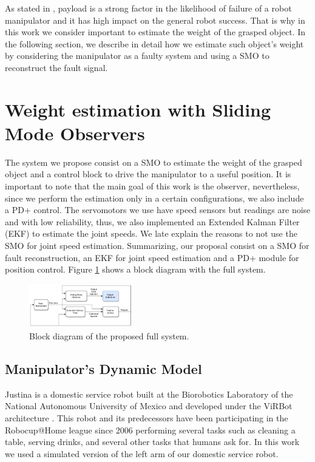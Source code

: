 \documentclass[conference,letterpaper]{ieeeconf}
\begin{document}
As stated in \cite{steinbauer2012survey}, payload is a strong factor in the likelihood of failure of a robot manipulator and it has high impact on the general robot success. That is why in this work we consider important to estimate the weight of the grasped object. In the following section, we describe in detail how we estimate such object's weight by considering the manipulator as a faulty system and using a SMO to reconstruct the fault signal.

\section{Weight estimation with Sliding Mode Observers}
\label{sec:System}

The system we propose consist on a SMO to estimate the weight of the grasped object and a control block to drive the manipulator to a useful position. It is important to note that the main goal of this work is the observer, nevertheless, since we perform the estimation only in a certain configurations, we also include a PD+ control. The servomotors we use have speed sensors but readings are noise and with low reliability, thus, we also implemented an Extended Kalman Filter (EKF) to estimate the joint speeds. We late explain the reasons to not use the SMO for joint speed estimation. Summarizing, our proposal consist on a SMO for fault reconstruction, an EKF for joint speed estimation and a PD+ module for position control. Figure \ref{fig:FullSystemBlocks} shows a block diagram with the full system. 
\begin{figure}
  \centering
  \includegraphics[width=0.4\textwidth]{Figures/full_system.pdf}
  \caption{Block diagram of the proposed full system.}
  \label{fig:FullSystemBlocks}
\end{figure}

\subsection{Manipulator's Dynamic Model}

Justina is a domestic service robot built at the Biorobotics Laboratory of the National Autonomous University of Mexico and developed under the ViRBot architecture \cite{savage2008virbot}. This robot and its predecessors have been participating in the Robocup@Home league \cite{wachsmuth2015robocup} since 2006 performing several tasks such as cleaning a table, serving drinks, and several other tasks that humans ask for. In this work we used a simulated version of the left arm of our domestic service robot.
\end{document}
